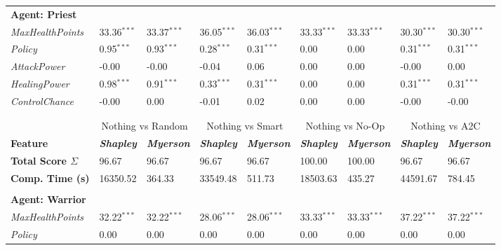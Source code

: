 \begin{tabular}{lllllllll}
\textbf{Agent: Priest }        &                           &                           & &\\
\textit{MaxHealthPoints} & 33.36${}^{***}$                   & 33.37${}^{***}$ & 36.05${}^{***}$ &  36.03${}^{***}$ & 33.33${}^{***}$  & 33.33${}^{***}$ & 30.30${}^{***}$  & 30.30${}^{***}$                \\
\textit{Policy}     & 0.95${}^{***}$                    & 0.93${}^{***}$      & 0.28${}^{***}$ &   0.31${}^{***}$ & 0.00 & 0.00 & 0.31${}^{***}$  & 0.31${}^{***}$         \\
\textit{AttackPower}     & -0.00                    & -0.00      & -0.04 &   0.06 & 0.00 & 0.00 & -0.00  & 0.00         \\
\textit{HealingPower}    & 0.98${}^{***}$                   & 0.91${}^{***}$     & 0.33${}^{***}$  & 0.31${}^{***}$ & 0.00 & 0.00 & 0.31${}^{***}$  & 0.31${}^{***}$        \\
\textit{ControlChance}   & -0.00                   & 0.00    & -0.01    & 0.02 & 0.00   & 0.00 & -0.00  & -0.00        \\
&                           & & & & &                          & &\\
&                           & & & & &                          & &\\
&\multicolumn{2}{c}{Nothing vs Random}&\multicolumn{2}{c}{Nothing vs Smart}&\multicolumn{2}{c}{Nothing vs No-Op}&\multicolumn{2}{c}{Nothing vs A2C}\\
\textbf{Feature}         & \textit{\textbf{Shapley}} & \textit{\textbf{Myerson}}& \textit{\textbf{Shapley}} & \textit{\textbf{Myerson}}& \textit{\textbf{Shapley}} & \textit{\textbf{Myerson}}& \textit{\textbf{Shapley}} & \textit{\textbf{Myerson}} \\
\textbf{Total Score $\Sigma$} & 96.67&96.67&96.67&96.67&100.00&100.00&96.67&96.67 \\\n\textbf{Comp. Time (s)} & 16350.52&364.33&33549.48&511.73&18503.63&435.27&44591.67&784.45 \\\n\hline
&                           & & & & &                          & &\\
\textbf{Agent: Warrior }        &                           &                           & &\\
\textit{MaxHealthPoints} & 32.22${}^{***}$                   & 32.22${}^{***}$ & 28.06${}^{***}$ &  28.06${}^{***}$ & 33.33${}^{***}$  & 33.33${}^{***}$ & 37.22${}^{***}$  & 37.22${}^{***}$                \\
\textit{Policy}     & 0.00                    & 0.00      & 0.00 &   0.00 & 0.00 & 0.00 & 0.00  & 0.00         \\

\end{tabular}
